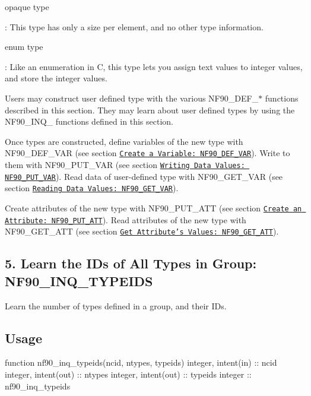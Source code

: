 {\ttfamily opaque type}

\+: This type has only a size per element, and no other type information.

{\ttfamily enum type}

\+: Like an enumeration in C, this type lets you assign text values to integer values, and store the integer values.

Users may construct user defined type with the various N\+F90\+\_\+\+D\+E\+F\+\_\+$\ast$ functions described in this section. They may learn about user defined types by using the N\+F90\+\_\+\+I\+N\+Q\+\_\+ functions defined in this section.

Once types are constructed, define variables of the new type with N\+F90\+\_\+\+D\+E\+F\+\_\+\+V\+AR (see section \href{#NF90_005fDEF_005fVAR}{\tt Create a Variable\+: {\ttfamily N\+F90\+\_\+\+D\+E\+F\+\_\+\+V\+AR}}). Write to them with N\+F90\+\_\+\+P\+U\+T\+\_\+\+V\+AR (see section \href{#NF90_005fPUT_005fVAR}{\tt Writing Data Values\+: {\ttfamily N\+F90\+\_\+\+P\+U\+T\+\_\+\+V\+AR}}). Read data of user-\/defined type with N\+F90\+\_\+\+G\+E\+T\+\_\+\+V\+AR (see section \href{#NF90_005fGET_005fVAR}{\tt Reading Data Values\+: {\ttfamily N\+F90\+\_\+\+G\+E\+T\+\_\+\+V\+AR}}).

Create attributes of the new type with N\+F90\+\_\+\+P\+U\+T\+\_\+\+A\+TT (see section \href{#NF90_005fPUT_005fATT}{\tt Create an Attribute\+: N\+F90\+\_\+\+P\+U\+T\+\_\+\+A\+TT}). Read attributes of the new type with N\+F90\+\_\+\+G\+E\+T\+\_\+\+A\+TT (see section \href{#NF90_005fGET_005fATT}{\tt Get Attribute’s Values\+: N\+F90\+\_\+\+G\+E\+T\+\_\+\+A\+TT}).\hypertarget{f90-user-defined-data-types_f90-learn-the-ids-of-all-types-in-group-nf90_inq_typeids}{}\subsection{5. Learn the I\+Ds of All Types in Group\+: N\+F90\+\_\+\+I\+N\+Q\+\_\+\+T\+Y\+P\+E\+I\+D\+S }\label{f90-user-defined-data-types_f90-learn-the-ids-of-all-types-in-group-nf90_inq_typeids}
Learn the number of types defined in a group, and their I\+Ds.

\subsection*{Usage}


\begin{DoxyCode}
\textcolor{keyword}{function }nf90\_inq\_typeids(ncid, ntypes, typeids)
  \textcolor{keywordtype}{integer}, \textcolor{keywordtype}{intent(in)} :: ncid
  \textcolor{keywordtype}{integer}, \textcolor{keywordtype}{intent(out)} :: ntypes
  \textcolor{keywordtype}{integer}, \textcolor{keywordtype}{intent(out)} :: typeids
  \textcolor{keywordtype}{integer} :: nf90\_inq\_typeids
\end{DoxyCode}


